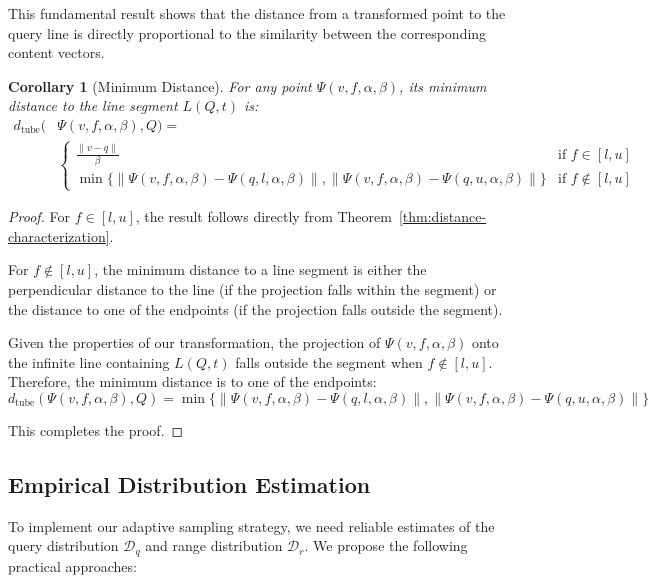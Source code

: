 \documentclass[numbers,sort]{article}
\newtheorem{corollary}{Corollary}
\begin{document}
This fundamental result shows that the distance from a transformed point to the query line is directly proportional to the similarity between the corresponding content vectors.


\begin{corollary}[Minimum Distance]
\label{cor:min-distance}
For any point $\Psi(v, f, \alpha, \beta)$, its minimum distance to the line segment $L(Q, t)$ is:
\begin{align}
d_{\text{tube}}(&\Psi(v, f, \alpha, \beta), Q) =\\& 
\begin{cases}
\frac{\|v - q\|}{\beta} & \text{if } f \in [l, u] \\
\min\{\|\Psi(v, f, \alpha, \beta) - \Psi(q, l, \alpha, \beta)\|, \|\Psi(v, f, \alpha, \beta) - \Psi(q, u, \alpha, \beta)\|\} & \text{if } f \notin [l, u]
\end{cases}
\end{align}
\end{corollary}

\begin{proof}
For $f \in [l, u]$, the result follows directly from Theorem~\ref{thm:distance-characterization}.

For $f \notin [l, u]$, the minimum distance to a line segment is either the perpendicular distance to the line (if the projection falls within the segment) or the distance to one of the endpoints (if the projection falls outside the segment).

Given the properties of our transformation, the projection of $\Psi(v, f, \alpha, \beta)$ onto the infinite line containing $L(Q, t)$ falls outside the segment when $f \notin [l, u]$. Therefore, the minimum distance is to one of the endpoints:
\begin{equation}
d_{\text{tube}}(\Psi(v, f, \alpha, \beta), Q) = \min\{\|\Psi(v, f, \alpha, \beta) - \Psi(q, l, \alpha, \beta)\|, \|\Psi(v, f, \alpha, \beta) - \Psi(q, u, \alpha, \beta)\|\}
\end{equation}

This completes the proof.
\end{proof}
\subsection{Empirical Distribution Estimation}
\label{sec:empirical-dist}
To implement our adaptive sampling strategy, we need reliable estimates of the query distribution $\mathcal{D}_q$ and range distribution $\mathcal{D}_r$. We propose the following practical approaches:
\end{document}
